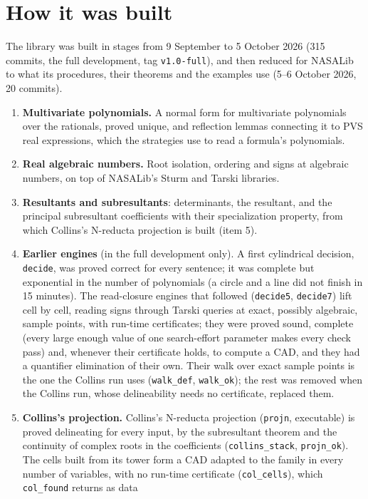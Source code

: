 \documentclass[11pt]{article}
\begin{document}
\section{How it was built}
The library was built in stages from 9 September to 5 October 2026 (315 commits, the full development, tag
\texttt{v1.0-full}), and then reduced for NASALib to what its procedures, their theorems and the examples use
(5--6 October 2026, 20 commits).
\begin{enumerate}[leftmargin=1.3em, itemsep=2pt, topsep=2pt]
\item \textbf{Multivariate polynomials.} A normal form for multivariate polynomials over the rationals, proved unique, and
reflection lemmas connecting it to PVS real expressions, which the strategies use to read a formula's polynomials.
\item \textbf{Real algebraic numbers.} Root isolation, ordering and signs at algebraic numbers, on top of NASALib's
Sturm and Tarski libraries.
\item \textbf{Resultants and subresultants}: determinants, the resultant, and the principal subresultant coefficients
with their specialization property, from which Collins's N-reducta projection is built (item 5).
\item \textbf{Earlier engines} (in the full development only). A first cylindrical decision, \texttt{decide}, was
proved correct for every sentence; it was complete but exponential in the number of polynomials (a circle and a line
did not finish in 15 minutes). The read-closure engines that followed (\texttt{decide5}, \texttt{decide7}) lift cell
by cell, reading signs through Tarski queries at exact, possibly algebraic, sample points, with run-time certificates;
they were proved sound, complete (every large enough value of one search-effort parameter makes every check pass)
and, whenever their certificate holds, to compute a CAD, and they had a quantifier elimination of their own. Their
walk over exact sample points is the one the Collins run uses (\texttt{walk\_def}, \texttt{walk\_ok}); the rest was
removed when the Collins run, whose delineability needs no certificate, replaced them.
\item \textbf{Collins's projection.} Collins's N-reducta projection (\texttt{projn}, executable) is proved delineating
for every input, by the subresultant theorem and the continuity of complex roots in the coefficients
(\texttt{collins\_stack}, \texttt{projn\_ok}). The cells built from its tower form a CAD adapted to the family in every
number of variables, with no run-time certificate (\texttt{col\_cells}), which \texttt{col\_found} returns as data

\end{enumerate}
\end{document}
